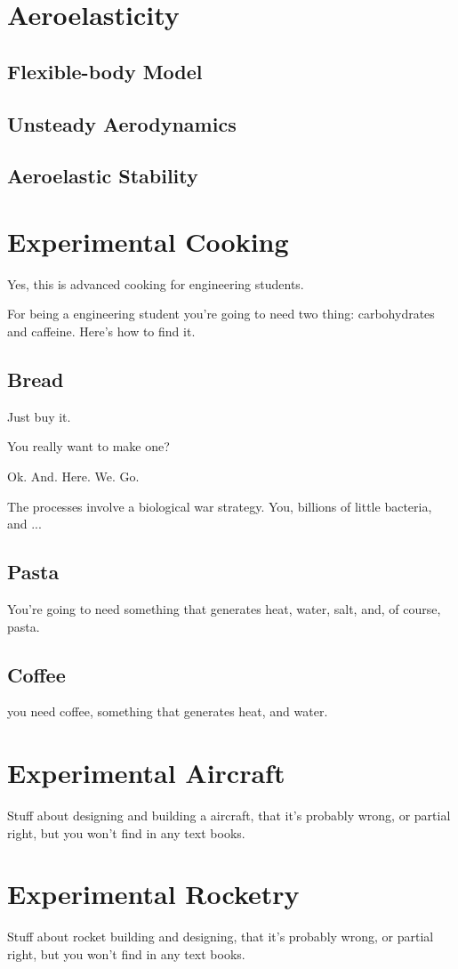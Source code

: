 
\chapter{Aeroelasticity}

\section{Flexible-body Model}
\section{Unsteady Aerodynamics}
\section{Aeroelastic Stability}

\chapter{Experimental Cooking}

Yes, this is advanced cooking for engineering students.

For being a engineering student you're going to need two thing:
carbohydrates and caffeine. Here's how to find it.

\section{Bread}
Just buy it.

You really want to make one?

Ok.
And. Here. We. Go.

The processes involve a biological war strategy. You, billions
of little bacteria, and ... 

\section{Pasta}
You're going to need something that generates heat, water,
salt, and, of course, pasta.

\section{Coffee}
you need coffee, something that generates heat, and water.

\chapter{Experimental Aircraft}

Stuff about designing and building a aircraft, that it's probably 
wrong, or partial right, but you won't find in any text books.

\chapter{Experimental Rocketry}

Stuff about rocket building and designing, that it's probably wrong,
or partial right, but you won't find in any text books.